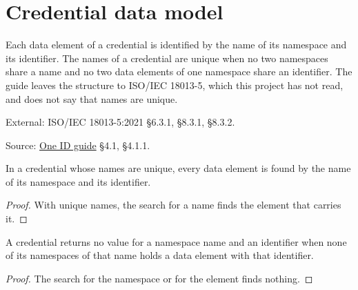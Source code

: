 
\section{Credential data model}

\begin{definition}
  \label{def:element}
  Each data element of a credential is identified by the name of its
  namespace and its identifier.  The names of a credential are unique when no
  two namespaces share a name and no two data elements of one namespace share
  an identifier.  The guide leaves the structure to ISO/IEC 18013-5, which
  this project has not read, and does not say that names are unique.

  External: ISO/IEC 18013-5:2021 §6.3.1, §8.3.1, §8.3.2.

  Source: \href{https://standards.atlassian.net/wiki/spaces/OneID/pages/2947416082/Technical+Implementation+Guide}{One ID guide} §4.1, §4.1.1.
\end{definition}

\begin{theorem}
  \label{thm:element-addressable}
  In a credential whose names are unique, every data element is found by the
  name of its namespace and its identifier.
\end{theorem}
\begin{proof}
  With unique names, the search for a name finds the element that carries it.
\end{proof}

\begin{theorem}
  \label{thm:element-absent}
  A credential returns no value for a namespace name and an identifier when
  none of its namespaces of that name holds a data element with that
  identifier.
\end{theorem}
\begin{proof}
  The search for the namespace or for the element finds nothing.
\end{proof}

